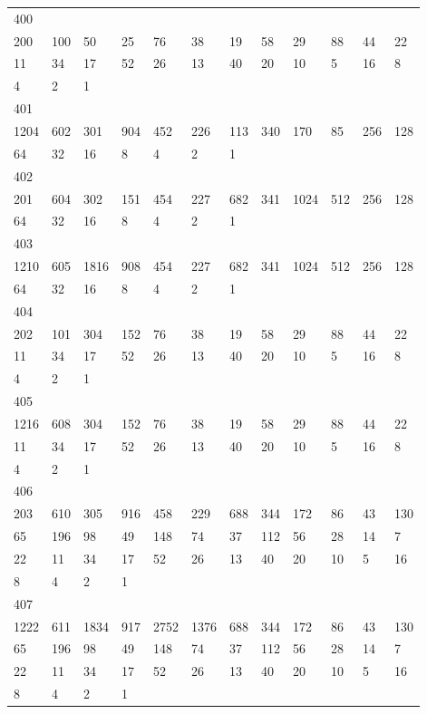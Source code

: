 \begin{longtable}{llllllllllll}
400&&&&&&&&&&&\\
200& 100& 50& 25& 76& 38& 19& 58& 29& 88& 44& 22\\
11& 34& 17& 52& 26& 13& 40& 20& 10& 5& 16& 8\\
4& 2& 1& \\

401&&&&&&&&&&&\\
1204& 602& 301& 904& 452& 226& 113& 340& 170& 85& 256& 128\\
64& 32& 16& 8& 4& 2& 1& \\

402&&&&&&&&&&&\\
201& 604& 302& 151& 454& 227& 682& 341& 1024& 512& 256& 128\\
64& 32& 16& 8& 4& 2& 1& \\

403&&&&&&&&&&&\\
1210& 605& 1816& 908& 454& 227& 682& 341& 1024& 512& 256& 128\\
64& 32& 16& 8& 4& 2& 1& \\

404&&&&&&&&&&&\\
202& 101& 304& 152& 76& 38& 19& 58& 29& 88& 44& 22\\
11& 34& 17& 52& 26& 13& 40& 20& 10& 5& 16& 8\\
4& 2& 1& \\

405&&&&&&&&&&&\\
1216& 608& 304& 152& 76& 38& 19& 58& 29& 88& 44& 22\\
11& 34& 17& 52& 26& 13& 40& 20& 10& 5& 16& 8\\
4& 2& 1& \\

406&&&&&&&&&&&\\
203& 610& 305& 916& 458& 229& 688& 344& 172& 86& 43& 130\\
65& 196& 98& 49& 148& 74& 37& 112& 56& 28& 14& 7\\
22& 11& 34& 17& 52& 26& 13& 40& 20& 10& 5& 16\\
8& 4& 2& 1& \\

407&&&&&&&&&&&\\
1222& 611& 1834& 917& 2752& 1376& 688& 344& 172& 86& 43& 130\\
65& 196& 98& 49& 148& 74& 37& 112& 56& 28& 14& 7\\
22& 11& 34& 17& 52& 26& 13& 40& 20& 10& 5& 16\\
8& 4& 2& 1& \\


\end{longtable}
